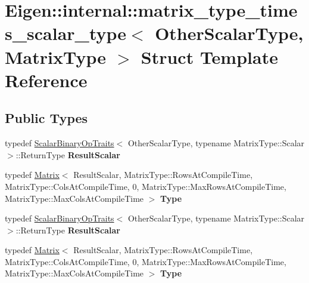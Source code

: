 \hypertarget{struct_eigen_1_1internal_1_1matrix__type__times__scalar__type}{}\section{Eigen\+:\+:internal\+:\+:matrix\+\_\+type\+\_\+times\+\_\+scalar\+\_\+type$<$ Other\+Scalar\+Type, Matrix\+Type $>$ Struct Template Reference}
\label{struct_eigen_1_1internal_1_1matrix__type__times__scalar__type}
\subsection*{Public Types}
\begin{DoxyCompactItemize}
\item 
\mbox{\label{struct_eigen_1_1internal_1_1matrix__type__times__scalar__type_a277b4d743057b1d06cf6c260825e7c65}} 
typedef \hyperlink{group___core___module_struct_eigen_1_1_scalar_binary_op_traits}{Scalar\+Binary\+Op\+Traits}$<$ Other\+Scalar\+Type, typename Matrix\+Type\+::\+Scalar $>$\+::Return\+Type {\bfseries Result\+Scalar}
\item 
\mbox{\label{struct_eigen_1_1internal_1_1matrix__type__times__scalar__type_ab6db0eae95f60a6267e95e9d30d17e6b}} 
typedef \hyperlink{group___core___module_class_eigen_1_1_matrix}{Matrix}$<$ Result\+Scalar, Matrix\+Type\+::\+Rows\+At\+Compile\+Time, Matrix\+Type\+::\+Cols\+At\+Compile\+Time, 0, Matrix\+Type\+::\+Max\+Rows\+At\+Compile\+Time, Matrix\+Type\+::\+Max\+Cols\+At\+Compile\+Time $>$ {\bfseries Type}
\item 
\mbox{\label{struct_eigen_1_1internal_1_1matrix__type__times__scalar__type_a277b4d743057b1d06cf6c260825e7c65}} 
typedef \hyperlink{group___core___module_struct_eigen_1_1_scalar_binary_op_traits}{Scalar\+Binary\+Op\+Traits}$<$ Other\+Scalar\+Type, typename Matrix\+Type\+::\+Scalar $>$\+::Return\+Type {\bfseries Result\+Scalar}
\item 
\mbox{\label{struct_eigen_1_1internal_1_1matrix__type__times__scalar__type_ab6db0eae95f60a6267e95e9d30d17e6b}} 
typedef \hyperlink{group___core___module_class_eigen_1_1_matrix}{Matrix}$<$ Result\+Scalar, Matrix\+Type\+::\+Rows\+At\+Compile\+Time, Matrix\+Type\+::\+Cols\+At\+Compile\+Time, 0, Matrix\+Type\+::\+Max\+Rows\+At\+Compile\+Time, Matrix\+Type\+::\+Max\+Cols\+At\+Compile\+Time $>$ {\bfseries Type}
\end{DoxyCompactItemize}


